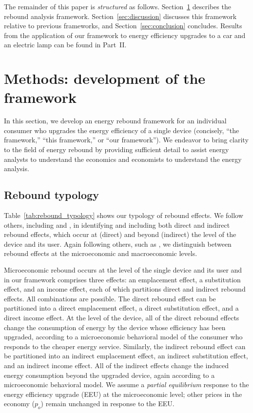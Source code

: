 \documentclass[12pt]{article}\usepackage[]{graphicx}\usepackage[]{xcolor}
\begin{document}
The remainder of this paper is \emph{structured} as follows.
Section~\ref{sec:framework} describes the rebound analysis framework.
Section~\ref{sec:discussion} discusses this framework relative to previous frameworks, and 
Section~\ref{sec:conclusion} concludes.
Results from the application of our framework
to energy efficiency upgrades to a car and an electric lamp
can be found in Part~II.


\section{Methods: development of the framework}
\label{sec:framework}

In this section, we develop 
an energy rebound framework
for an individual consumer who upgrades the energy efficiency 
of a single device
(concisely, ``the framework,'' ``this framework,'' or ``our framework'').
We endeavor to bring clarity to the field of energy rebound by 
providing sufficient detail to assist
energy analysts to understand the economics and
economists to understand the energy analysis.


\subsection{Rebound typology}
\label{sec:rebound_typology}



Table~\ref{tab:rebound_typology} shows our typology of rebound effects.
We follow others, including \citet{Jenkins2011} and \citet{Walnum2014}, 
in identifying and including both direct and indirect rebound effects, 
which occur at (direct) and beyond (indirect) 
the level of the device and its user.
Again following others, such as \citet{Gillingham2016}, 
we distinguish between rebound effects 
at the microeconomic and macroeconomic levels.

Microeconomic rebound occurs at the level 
of the single device and its user and
in our framework comprises three effects: 
an emplacement effect, 
a substitution effect, and
an income effect, each of which 
partitions direct and indirect rebound effects.
All combinations are possible.
The direct rebound effect can be partitioned into 
a direct emplacement effect, 
a direct substitution effect, and
a direct income effect. 
At the level of the device, 
all of the direct rebound effects change the consumption 
of energy
by the device whose efficiency has been upgraded,  
according to a microeconomic behavioral model of the consumer who
responds to the cheaper energy service.
Similarly, the indirect rebound effect can be partitioned into
an indirect emplacement effect, 
an indirect substitution effect, and
an indirect income effect. 
All of the indirect effects
change the induced energy consumption
beyond the upgraded device, 
again according to a microeconomic behavioral model.
We assume a \emph{partial equilibrium} response to the 
energy efficiency upgrade (EEU)
at the microeconomic level;
other prices in the economy ($p_o$) remain unchanged
in response to the EEU.
\end{document}
